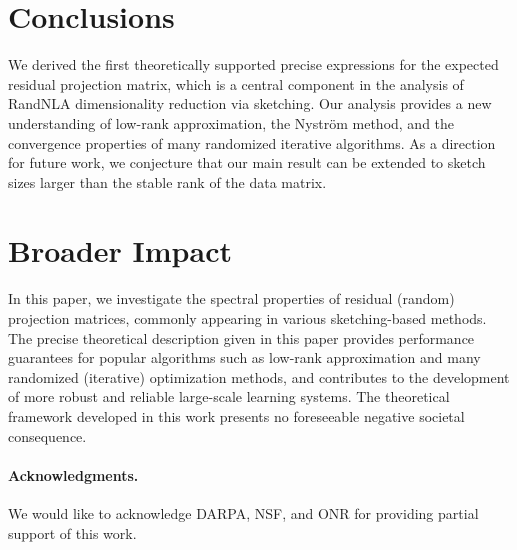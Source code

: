\documentclass{article}
\begin{document}
\section{Conclusions}

We derived the first theoretically supported precise expressions for the
expected residual projection matrix, which is a central component in
the analysis of RandNLA dimensionality reduction via sketching. Our
analysis provides a new understanding of low-rank approximation, the Nystr\"om method, and the
convergence properties of many randomized iterative algorithms. As a direction for future work, we conjecture that our
main result can be extended to sketch sizes larger than the stable
rank of the data matrix.

\ifisarxiv\else
\section*{Broader Impact}
In this paper, we investigate the spectral properties of residual
(random) projection matrices, commonly appearing in various
sketching-based methods. The precise theoretical description given in
this paper provides performance guarantees for popular algorithms
such as low-rank approximation and many randomized (iterative)
optimization methods, and contributes to the development of more
robust and reliable large-scale learning systems. The
theoretical framework developed in this work presents no foreseeable
negative societal consequence. 
\fi


\paragraph{Acknowledgments.}
We would like to acknowledge DARPA, NSF, and ONR for providing partial support of this work.







\end{document}
